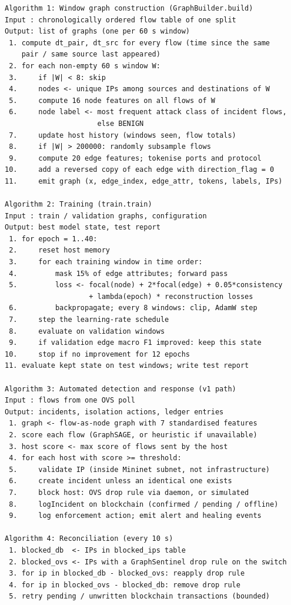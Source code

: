 \documentclass[12pt,a4paper]{report}
\begin{document}
\begin{verbatim}
Algorithm 1: Window graph construction (GraphBuilder.build)
Input : chronologically ordered flow table of one split
Output: list of graphs (one per 60 s window)
 1. compute dt_pair, dt_src for every flow (time since the same
    pair / same source last appeared)
 2. for each non-empty 60 s window W:
 3.     if |W| < 8: skip
 4.     nodes <- unique IPs among sources and destinations of W
 5.     compute 16 node features on all flows of W
 6.     node label <- most frequent attack class of incident flows,
                      else BENIGN
 7.     update host history (windows seen, flow totals)
 8.     if |W| > 200000: randomly subsample flows
 9.     compute 20 edge features; tokenise ports and protocol
10.     add a reversed copy of each edge with direction_flag = 0
11.     emit graph (x, edge_index, edge_attr, tokens, labels, IPs)

Algorithm 2: Training (train.train)
Input : train / validation graphs, configuration
Output: best model state, test report
 1. for epoch = 1..40:
 2.     reset host memory
 3.     for each training window in time order:
 4.         mask 15% of edge attributes; forward pass
 5.         loss <- focal(node) + 2*focal(edge) + 0.05*consistency
                    + lambda(epoch) * reconstruction losses
 6.         backpropagate; every 8 windows: clip, AdamW step
 7.     step the learning-rate schedule
 8.     evaluate on validation windows
 9.     if validation edge macro F1 improved: keep this state
10.     stop if no improvement for 12 epochs
11. evaluate kept state on test windows; write test report

Algorithm 3: Automated detection and response (v1 path)
Input : flows from one OVS poll
Output: incidents, isolation actions, ledger entries
 1. graph <- flow-as-node graph with 7 standardised features
 2. score each flow (GraphSAGE, or heuristic if unavailable)
 3. host score <- max score of flows sent by the host
 4. for each host with score >= threshold:
 5.     validate IP (inside Mininet subnet, not infrastructure)
 6.     create incident unless an identical one exists
 7.     block host: OVS drop rule via daemon, or simulated
 8.     logIncident on blockchain (confirmed / pending / offline)
 9.     log enforcement action; emit alert and healing events

Algorithm 4: Reconciliation (every 10 s)
 1. blocked_db  <- IPs in blocked_ips table
 2. blocked_ovs <- IPs with a GraphSentinel drop rule on the switch
 3. for ip in blocked_db - blocked_ovs: reapply drop rule
 4. for ip in blocked_ovs - blocked_db: remove drop rule
 5. retry pending / unwritten blockchain transactions (bounded)
\end{verbatim}
\end{document}
